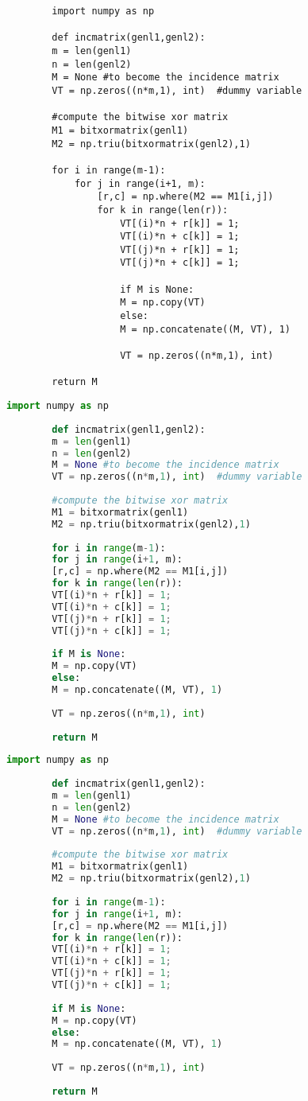 \documentclass[]{article}
\begin{document}
	
	\begin{lstlisting}
		import numpy as np
		
		def incmatrix(genl1,genl2):
		m = len(genl1)
		n = len(genl2)
		M = None #to become the incidence matrix
		VT = np.zeros((n*m,1), int)  #dummy variable
		
		#compute the bitwise xor matrix
		M1 = bitxormatrix(genl1)
		M2 = np.triu(bitxormatrix(genl2),1) 
		
		for i in range(m-1):
			for j in range(i+1, m):
				[r,c] = np.where(M2 == M1[i,j])
				for k in range(len(r)):
					VT[(i)*n + r[k]] = 1;
					VT[(i)*n + c[k]] = 1;
					VT[(j)*n + r[k]] = 1;
					VT[(j)*n + c[k]] = 1;
					
					if M is None:
					M = np.copy(VT)
					else:
					M = np.concatenate((M, VT), 1)
					
					VT = np.zeros((n*m,1), int)
		
		return M
	\end{lstlisting}
	
	\begin{lstlisting}[language=Python]
		import numpy as np
		
		def incmatrix(genl1,genl2):
		m = len(genl1)
		n = len(genl2)
		M = None #to become the incidence matrix
		VT = np.zeros((n*m,1), int)  #dummy variable
		
		#compute the bitwise xor matrix
		M1 = bitxormatrix(genl1)
		M2 = np.triu(bitxormatrix(genl2),1) 
		
		for i in range(m-1):
		for j in range(i+1, m):
		[r,c] = np.where(M2 == M1[i,j])
		for k in range(len(r)):
		VT[(i)*n + r[k]] = 1;
		VT[(i)*n + c[k]] = 1;
		VT[(j)*n + r[k]] = 1;
		VT[(j)*n + c[k]] = 1;
		
		if M is None:
		M = np.copy(VT)
		else:
		M = np.concatenate((M, VT), 1)
		
		VT = np.zeros((n*m,1), int)
		
		return M
	\end{lstlisting}
	
	\begin{lstlisting}[language=Python, caption=Python example]
		import numpy as np
		
		def incmatrix(genl1,genl2):
		m = len(genl1)
		n = len(genl2)
		M = None #to become the incidence matrix
		VT = np.zeros((n*m,1), int)  #dummy variable
		
		#compute the bitwise xor matrix
		M1 = bitxormatrix(genl1)
		M2 = np.triu(bitxormatrix(genl2),1) 
		
		for i in range(m-1):
		for j in range(i+1, m):
		[r,c] = np.where(M2 == M1[i,j])
		for k in range(len(r)):
		VT[(i)*n + r[k]] = 1;
		VT[(i)*n + c[k]] = 1;
		VT[(j)*n + r[k]] = 1;
		VT[(j)*n + c[k]] = 1;
		
		if M is None:
		M = np.copy(VT)
		else:
		M = np.concatenate((M, VT), 1)
		
		VT = np.zeros((n*m,1), int)
		
		return M
	\end{lstlisting}
	
	
	
\end{document}
